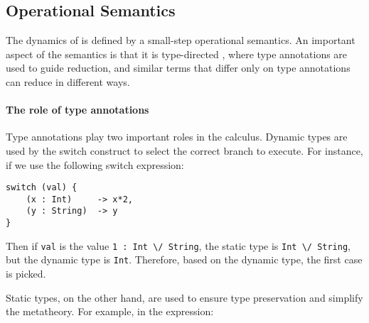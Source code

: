 \begin{comment}
\begin{figure}[t]
  \begin{small}
    \centering
    \drules[typ]{$ [[G |- e dirflag A]] $}{Bi-directional Typing}{int, var, ann, app, sub, abs, typeof}
  \end{small}
  \caption{Typing for \cal.}
  \label{fig:union:typ}
\end{figure}
\end{comment}

\subsection{Operational Semantics}
\label{sec:union:os}
The dynamics of \cal is defined by a small-step operational semantics. An
important aspect of the semantics is that it is type-directed
\cite{Huang:typedirected}, where type annotations are used to guide reduction,
and similar terms that differ only on type annotations can reduce in different
ways.

\paragraph{The role of type annotations}
Type annotations play two important roles in the calculus.
Dynamic types are used by the switch construct
to select the correct branch to execute.
For instance, if we use the following switch expression:

\begin{lstlisting}[xleftmargin=.2\textwidth, xrightmargin=.2\textwidth]
switch (val) {
    (x : Int)     -> x*2,
    (y : String)  -> y 
}
\end{lstlisting}

\noindent Then if \lstinline{val} is the value \lstinline{1 : Int \/ String},
the static type is \lstinline{Int \/ String}, but the dynamic
type is \lstinline{Int}. Therefore, based on the dynamic type,
the first case is picked. 

Static types, on the other hand, are used to ensure type preservation
and simplify the metatheory.
For example, in the expression:

